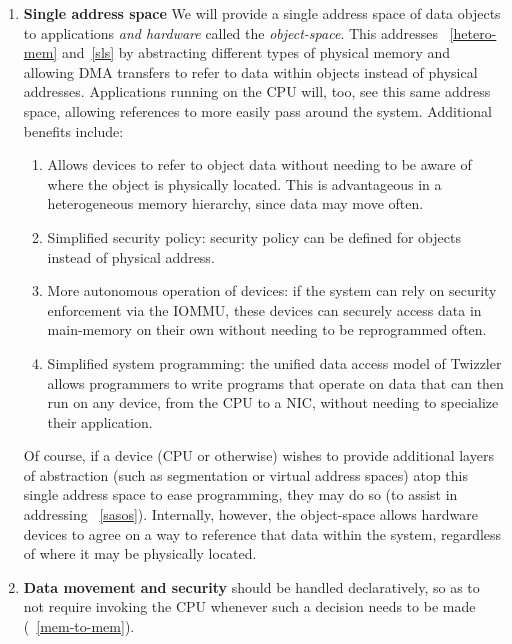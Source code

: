 {\begin{enumerate}
        \item \textbf{Single address space} We will provide a single address space of data objects to
              applications \emph{and hardware} called the \emph{object-space}. This addresses
              \observations~\ref{hetero-mem} and~\ref{sls} by abstracting
              different types of physical memory and allowing DMA transfers to refer to data within
              objects instead of physical addresses. Applications running on the CPU will, too, see this
              same address space, allowing references to more easily pass around the system. Additional
              benefits include:
              \begin{enumerate}
                  \item Allows devices to refer to object data without needing to be aware of where the
                        object is physically located. This is advantageous in a heterogeneous memory
                        hierarchy, since data may move often.
                  \item Simplified security policy: security policy can be defined for objects instead of
                        physical address.
                  \item More autonomous operation of devices: if the system can rely on security
                        enforcement via the IOMMU, these devices can securely access data in main-memory on
                        their own without needing to be reprogrammed often.
                  \item Simplified system programming: the unified data access model of Twizzler allows
                        programmers to write programs that operate on data
                        that can then run on any device, from the CPU to a NIC, without needing to
                        specialize their application.
              \end{enumerate}
              Of course, if a device (CPU or otherwise) wishes to provide additional layers of abstraction
              (such as segmentation or virtual address spaces) atop this single address space to ease
              programming, they may do so (to assist in addressing \observation~\ref{sasos}). Internally, however, the object-space allows hardware devices
              to agree on a way to reference that data within the system, regardless of where it may be
              physically located.
        \item \textbf{Data movement and security} should be handled declaratively, so as to not require invoking
              the CPU whenever such a decision needs to be made (\observation~\ref{mem-to-mem}).
    \end{enumerate}
}

